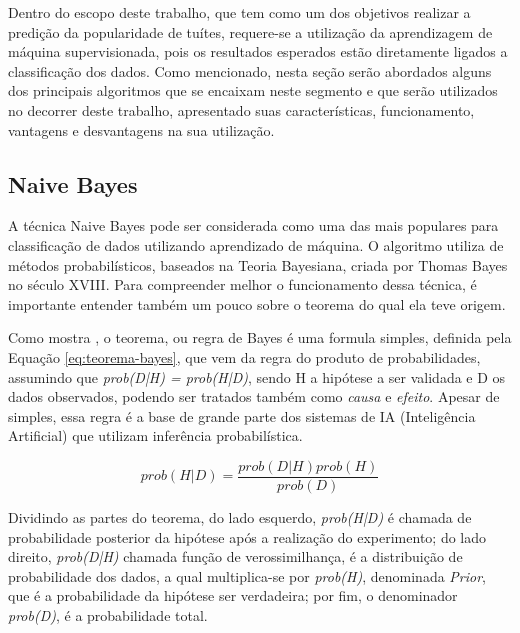 \documentclass[oneside,openright,12pt]{ufsm_2015} %
\begin{document}
    \par Dentro do escopo deste trabalho, que tem como um dos objetivos realizar a predição da popularidade de tuítes, requere-se a utilização da aprendizagem de máquina supervisionada, pois os resultados esperados estão diretamente ligados a classificação dos dados. Como mencionado, nesta seção serão abordados alguns dos principais algoritmos que se encaixam neste segmento e que serão utilizados no decorrer deste trabalho, apresentado suas características, funcionamento, vantagens e desvantagens na sua utilização.


\subsection{Naive Bayes}
\label{sec:naive-bayes}

    \par A técnica Naive Bayes pode ser considerada como uma das mais populares para classificação de dados utilizando aprendizado de máquina. O algoritmo utiliza de métodos probabilísticos, baseados na Teoria Bayesiana, criada por Thomas Bayes no século XVIII. Para compreender melhor o funcionamento dessa técnica, é importante entender também um pouco sobre o teorema do qual ela teve origem.

    \par Como mostra \cite{book:russell:10}, o teorema, ou regra de Bayes é uma formula simples, definida pela Equação \ref{eq:teorema-bayes}, que vem da regra do produto de probabilidades, assumindo que \textit{prob(D|H) = prob(H|D)}, sendo H a hipótese a ser validada e D os dados observados, podendo ser tratados também como \textit{causa} e \textit{efeito}. Apesar de simples, essa regra é a base de grande parte dos sistemas de IA (Inteligência Artificial) que utilizam inferência probabilística.
    
    \begin{equation} \label{eq:teorema-bayes}
    prob(H|D) = \frac{prob(D|H)prob(H)}{prob(D)}
    \end{equation}
    
    \par Dividindo as partes do teorema, do lado esquerdo, \textit{prob(H|D)} é chamada de probabilidade posterior da hipótese após a realização do experimento; do lado direito, \textit{prob(D|H)} chamada função de verossimilhança, é a distribuição de probabilidade dos dados, a qual multiplica-se por \textit{prob(H)}, denominada \textit{Prior}, que é a probabilidade da hipótese ser verdadeira; por fim, o denominador \textit{prob(D)}, é a probabilidade total.
    
\end{document}
